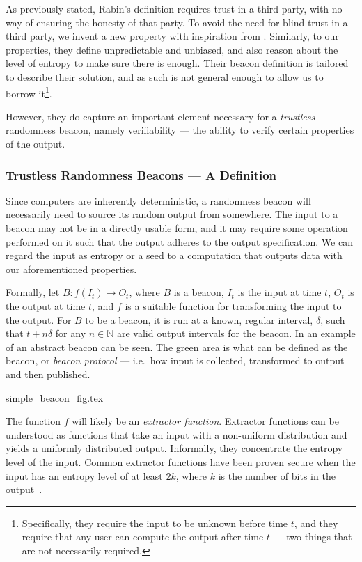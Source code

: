 As previously stated, Rabin's definition requires trust in a third party, with no way of ensuring the honesty of that party.
To avoid the need for blind trust in a third party, we invent a new property with inspiration from \citet{bonneau2015bitcoin}.
Similarly, to our properties, they define unpredictable and unbiased, and also reason about the level of entropy to make sure there is enough.
Their beacon definition is tailored to describe their solution, and as such is not general enough to allow us to borrow it\footnote{Specifically, they require the input to be unknown before time $t$, and they require that any user can compute the output after time $t$ --- two things that are not necessarily required.}.

However, they do capture an important element necessary for a \emph{trustless} randomness beacon, namely verifiability --- the ability to verify certain properties of the output.


\subsubsection{Trustless Randomness Beacons --- A Definition}
Since computers are inherently deterministic, a randomness beacon will necessarily need to source its random output from somewhere.
The input to a beacon may not be in a directly usable form, and it may require some operation performed on it such that the output adheres to the output specification.
We can regard the input as entropy or a seed to a computation that outputs data with our aforementioned properties.

Formally, let $B: f(I_t) \rightarrow O_t$, where $B$ is a beacon, $I_t$ is the input at time $t$, $O_t$ is the output at time $t$, and $f$ is a suitable function for transforming the input to the output.
For $B$ to be a beacon, it is run at a known, regular interval, $\delta$, such that $t+n\delta$ for any $n \in \mathbb{N}$ are valid output intervals for the beacon.
In  an example of an abstract beacon can be seen.
The green area is what can be defined as the beacon, or \emph{beacon protocol} --- i.e.\ how input is collected, transformed to output and then published.

{simple_beacon_fig.tex}

The function $f$ will likely be an \emph{extractor function}.
Extractor functions can be understood as functions that take an input with a non-uniform distribution and yields a uniformly distributed output.
Informally, they concentrate the entropy level of the input.
Common extractor functions have been proven secure when the input has an entropy level of at least $2k$, where $k$ is the number of bits in the output~\cite{dodis2004randomness}.


